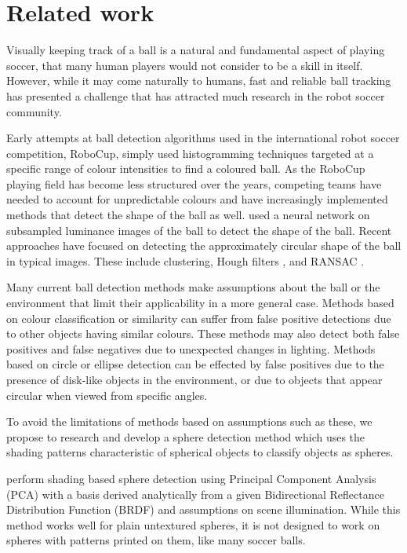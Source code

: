\documentclass{llncs}
\begin{document}
    \section{Related work} {
    \label{sec:related_work}

        Visually keeping track of a ball is a natural and fundamental aspect of playing soccer, that many human players would not consider to be a skill in itself. However, while it may come naturally to humans, fast and reliable ball tracking has presented a challenge that has attracted much research in the robot soccer community.

        Early attempts at ball detection algorithms used in the international robot soccer competition, RoboCup, simply used histogramming techniques targeted at a specific range of colour intensities to find a coloured ball. As the RoboCup playing field has become less structured over the years, competing teams have needed to account for unpredictable colours and have increasingly implemented methods that detect the shape of the ball as well. \citet{schulz2007ball} used a neural network on subsampled luminance images of the ball to detect the shape of the ball. Recent approaches have focused on detecting the approximately circular shape of the ball in typical images. These include clustering, Hough filters \citep{li2013survey}, and RANSAC \citep{annable2013nubots}.

        Many current ball detection methods make assumptions about the ball or the environment that limit their applicability in a more general case. Methods based on colour classification or similarity can suffer from false positive detections due to other objects having similar colours. These methods may also detect both false positives and false negatives due to unexpected changes in lighting. Methods based on circle or ellipse detection can be effected by false positives due to the presence of disk-like objects in the environment, or due to objects that appear circular when viewed from specific angles.

        To avoid the limitations of methods based on assumptions such as these, we propose to research and develop a sphere detection method which uses the shading patterns characteristic of spherical objects to classify objects as spheres.

        \citet{nillius2008shading} perform shading based sphere detection using Principal Component Analysis (PCA) with a basis derived analytically from a given Bidirectional Reflectance Distribution Function (BRDF) and assumptions on scene illumination. While this method works well for plain untextured spheres, it is
        not designed to work on spheres with patterns printed on them, like many soccer balls.

}
\end{document}
